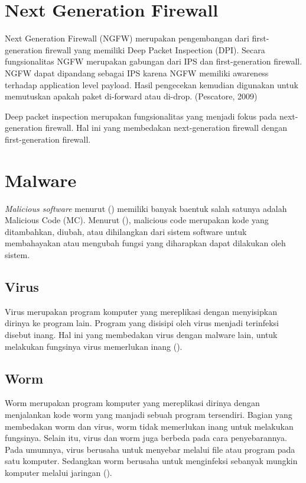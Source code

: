 \section{Next Generation Firewall}

Next Generation Firewall (NGFW) merupakan pengembangan dari first-generation firewall yang memiliki Deep Packet Inspection (DPI). Secara fungsionalitas NGFW merupakan gabungan dari IPS dan first-generation firewall. NGFW dapat dipandang sebagai IPS karena NGFW memiliki awareness terhadap application level payload. Hasil pengecekan kemudian digunakan untuk memutuskan apakah paket di-forward atau di-drop. (Pescatore, 2009)

Deep packet inspection merupakan fungsionalitas yang menjadi fokus pada next-generation firewall. Hal ini yang membedakan next-generation firewall dengan first-generation firewall.

\section{Malware}
\textit{Malicious software} menurut (\cite{idika2007survey}) memiliki banyak baentuk salah satunya adalah Malicious Code (MC). Menurut (\cite{attackingmalcode}), malicious code merupakan kode yang ditambahkan, diubah, atau dihilangkan dari sistem software untuk membahayakan atau mengubah fungsi yang diharapkan dapat dilakukan oleh sistem.

\subsection{Virus}
Virus merupakan program komputer yang mereplikasi dengan menyisipkan dirinya ke program lain. Program yang disisipi oleh virus menjadi terinfeksi disebut inang. Hal ini yang membedakan virus dengan malware lain, untuk melakukan fungsinya virus memerlukan inang (\cite{attackingmalcode}). 

\subsection{Worm}
Worm merupakan program komputer yang mereplikasi dirinya dengan menjalankan kode worm yang manjadi sebuah program tersendiri. Bagian yang membedakan worm dan virus, worm tidak memerlukan inang untuk melakukan fungsinya. Selain itu, virus dan worm juga berbeda pada cara penyebarannya. Pada umumnya, virus berusaha untuk menyebar melalui file atau program pada satu komputer. Sedangkan worm berusaha untuk menginfeksi sebanyak mungkin komputer melalui jaringan (\cite{attackingmalcode}).

